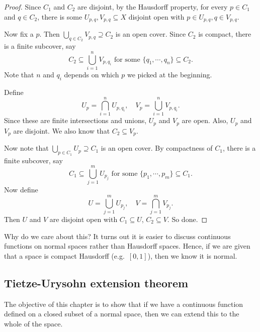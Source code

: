 \documentclass[a4paper]{article}
\begin{document}
\begin{proof}
  Since $C_1$ and $C_2$ are disjoint, by the Hausdorff property, for every $p \in C_1$ and $q \in C_2$, there is some $U_{p, q}, V_{p, q}\subseteq X$ disjoint open with $p \in U_{p, q}, q \in V_{p, q}$.

  Now fix a $p$. Then $\bigcup_{q \in C_2}V_{p, q}\supseteq C_2$ is an open cover. Since $C_2$ is compact, there is a finite subcover, say
  \[
    C_2 \subseteq \bigcup_{i = 1}^n V_{p, q_i}\text{ for some }\{q_1,\cdots, q_n\}\subseteq C_2.
  \]
  Note that $n$ and $q_i$ depends on which $p$ we picked at the beginning.

  Define
  \[
    U_p = \bigcap_{i=1}^n U_{p, q_i},\quad V_p = \bigcup_{i = 1}^n V_{p, q_i}.
  \]
  Since these are finite intersections and unions, $U_p$ and $V_p$ are open. Also, $U_p$ and $V_p$ are disjoint. We also know that $C_2 \subseteq V_p$.

  Now note that $\bigcup_{p \in C_1} U_p \supseteq C_1$ is an open cover. By compactness of $C_1$, there is a finite subcover, say
  \[
    C_1 \subseteq \bigcup_{j = 1}^m U_{p_j}\text{ for some }\{p_1, \cdots, p_m\}\subseteq C_1.
  \]
  Now define
  \[
    U = \bigcup_{j = 1}^m U_{p_j},\quad V = \bigcap_{j = 1}^m V_{p_j}.
  \]
  Then $U$ and $V$ are disjoint open with $C_1 \subseteq U$, $C_2 \subseteq V$. So done.
\end{proof}
Why do we care about this? It turns out it is easier to discuss continuous functions on normal spaces rather than Hausdorff spaces. Hence, if we are given that a space is compact Hausdorff (e.g.\ $[0, 1]$), then we know it is normal.

\subsection{Tietze-Urysohn extension theorem}
The objective of this chapter is to show that if we have a continuous function defined on a closed subset of a normal space, then we can extend this to the whole of the space.
\end{document}
